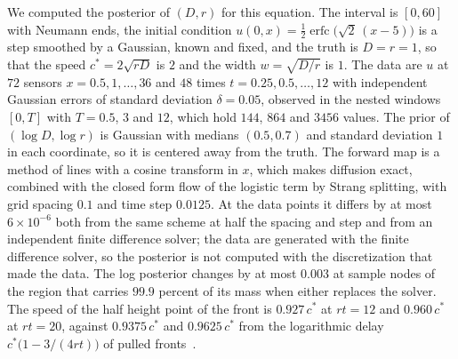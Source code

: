 We computed the posterior of $(D,r)$ for this equation. The interval is $[0,60]$ with Neumann ends, the initial condition $u(0,x)=\tfrac12\operatorname{erfc}\big(\sqrt2\,(x-5)\big)$ is a step smoothed by a Gaussian, known and fixed, and the truth is $D=r=1$, so that the speed $c^*=2\sqrt{rD}$ is $2$ and the width $w=\sqrt{D/r}$ is $1$. The data are $u$ at $72$ sensors $x=0.5,1,\dots,36$ and $48$ times $t=0.25,0.5,\dots,12$ with independent Gaussian errors of standard deviation $\delta=0.05$, observed in the nested windows $[0,T]$ with $T=0.5$, $3$ and $12$, which hold $144$, $864$ and $3456$ values. The prior of $(\log D,\log r)$ is Gaussian with medians $(0.5,0.7)$ and standard deviation $1$ in each coordinate, so it is centered away from the truth. The forward map is a method of lines with a cosine transform in $x$, which makes diffusion exact, combined with the closed form flow of the logistic term by Strang splitting, with grid spacing $0.1$ and time step $0.0125$. At the data points it differs by at most $6\times10^{-6}$ both from the same scheme at half the spacing and step and from an independent finite difference solver; the data are generated with the finite difference solver, so the posterior is not computed with the discretization that made the data. The log posterior changes by at most $0.003$ at sample nodes of the region that carries $99.9$ percent of its mass when either replaces the solver. The speed of the half height point of the front is $0.927\,c^*$ at $rt=12$ and $0.960\,c^*$ at $rt=20$, against $0.9375\,c^*$ and $0.9625\,c^*$ from the logarithmic delay $c^*\big(1-3/(4rt)\big)$ of pulled fronts~\cite{bramson1983,ebert2000}.

